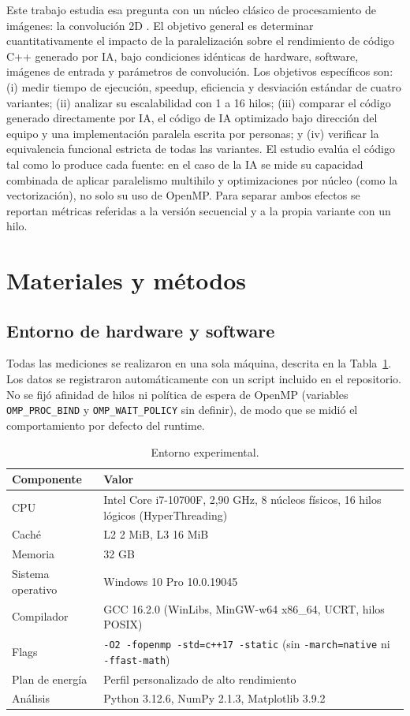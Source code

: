 \documentclass[12pt]{article}
\newcommand{\fuente}{\par\vspace{2pt}{\footnotesize Fuente: elaboración propia.}}
\begin{document}
Este trabajo estudia esa pregunta con un núcleo clásico de procesamiento de imágenes: la convolución 2D \cite{gonzalez2018}. El objetivo general es determinar cuantitativamente el impacto de la paralelización sobre el rendimiento de código C++ generado por IA, bajo condiciones idénticas de hardware, software, imágenes de entrada y parámetros de convolución. Los objetivos específicos son: (i) medir tiempo de ejecución, speedup, eficiencia y desviación estándar de cuatro variantes; (ii) analizar su escalabilidad con 1 a 16 hilos; (iii) comparar el código generado directamente por IA, el código de IA optimizado bajo dirección del equipo y una implementación paralela escrita por personas; y (iv) verificar la equivalencia funcional estricta de todas las variantes. El estudio evalúa el código tal como lo produce cada fuente: en el caso de la IA se mide su capacidad combinada de aplicar paralelismo multihilo y optimizaciones por núcleo (como la vectorización), no solo su uso de OpenMP. Para separar ambos efectos se reportan métricas referidas a la versión secuencial y a la propia variante con un hilo.

\section{Materiales y métodos}

\subsection{Entorno de hardware y software}
Todas las mediciones se realizaron en una sola máquina, descrita en la Tabla~\ref{tab:entorno}. Los datos se registraron automáticamente con un script incluido en el repositorio. No se fijó afinidad de hilos ni política de espera de OpenMP (variables \texttt{OMP\_PROC\_BIND} y \texttt{OMP\_WAIT\_POLICY} sin definir), de modo que se midió el comportamiento por defecto del runtime.

\begin{table}[H]
\centering
\caption{Entorno experimental.}
\label{tab:entorno}
\begin{tabular}{lp{11cm}}
\toprule
Componente & Valor \\
\midrule
CPU & Intel Core i7-10700F, 2,90 GHz, 8 núcleos físicos, 16 hilos lógicos (HyperThreading) \\
Caché & L2 2 MiB, L3 16 MiB \\
Memoria & 32 GB \\
Sistema operativo & Windows 10 Pro 10.0.19045 \\
Compilador & GCC 16.2.0 (WinLibs, MinGW-w64 x86\_64, UCRT, hilos POSIX) \cite{gccdoc} \\
Flags & \texttt{-O2 -fopenmp -std=c++17 -static} (sin \texttt{-march=native} ni \texttt{-ffast-math}) \\
Plan de energía & Perfil personalizado de alto rendimiento \\
Análisis & Python 3.12.6, NumPy 2.1.3, Matplotlib 3.9.2 \\
\bottomrule
\end{tabular}
\fuente
\end{table}
\end{document}
